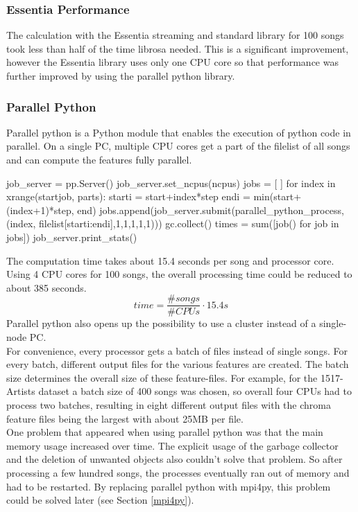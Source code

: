 \subsubsection{Essentia Performance}

The calculation with the Essentia streaming and standard library for 100 songs took less than half of the time librosa needed. This is a significant improvement, however the Essentia library uses only one CPU core so that performance was further improved by using the parallel python library.

\subsubsection{Parallel Python}

Parallel python is a Python module that enables the execution of python code in parallel. On a single PC, multiple CPU cores get a part of the filelist of all songs and can compute the features fully parallel.
\begin{pythonCode}[frame=single,label={lst:pp},caption={parallel python},captionpos=b]
job_server = pp.Server()
job_server.set_ncpus(ncpus)
jobs = [ ]
for index in xrange(startjob, parts):
	starti = start+index*step
	endi = min(start+(index+1)*step, end)
	jobs.append(job_server.submit(parallel_python_process, (index, 
		filelist[starti:endi],1,1,1,1,1)))
	gc.collect()
times = sum([job() for job in jobs])
job_server.print_stats()
\end{pythonCode}
The computation time takes about 15.4 seconds per song and processor core. Using 4 CPU cores for 100 songs, the overall processing time could be reduced to about 385 seconds. 
\begin{equation} \label{eq:parallelp}
time = \frac{\#songs}{\#CPUs} \cdot 15.4s
\end{equation}
Parallel python also opens up the possibility to use a cluster instead of a single-node PC.\\
For convenience, every processor gets a batch of files instead of single songs. For every batch, different output files for the various features are created. The batch size determines the overall size of these feature-files. For example, for the 1517-Artists dataset a batch size of 400 songs was chosen, so overall four CPUs had to process two batches, resulting in eight different output files with the chroma feature files being the largest with about 25MB per file.\\
One problem that appeared when using parallel python was that the main memory usage increased over time. The explicit usage of the garbage collector and the deletion of unwanted objects also couldn't solve that problem. So after processing a few hundred songs, the processes eventually ran out of memory and had to be restarted. By replacing parallel python with mpi4py, this problem could be solved later (see Section \ref{mpi4py}). 


